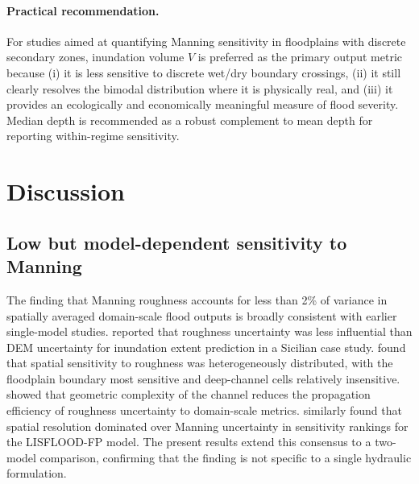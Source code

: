 \documentclass[review,12pt]{elsarticle}
\begin{document}
\paragraph{Practical recommendation.}
For studies aimed at quantifying Manning sensitivity in floodplains with
discrete secondary zones, inundation volume $V$ is preferred as the primary
output metric because (i) it is less sensitive to discrete wet/dry boundary
crossings, (ii) it still clearly resolves the bimodal distribution where it
is physically real, and (iii) it provides an ecologically and economically
meaningful measure of flood severity.
Median depth is recommended as a robust complement to mean depth for
reporting within-regime sensitivity.

\section{Discussion}
\label{sec:discussion}

\subsection{Low but model-dependent sensitivity to Manning}
\label{sec:disc_sensitivity}

The finding that Manning roughness accounts for less than 2\% of variance in
spatially averaged domain-scale flood outputs is broadly consistent with
earlier single-model studies.
\citet{aronica2002} reported that roughness uncertainty was less influential
than DEM uncertainty for inundation extent prediction in a Sicilian case
study.
\citet{hall2005} found that spatial sensitivity to roughness was
heterogeneously distributed, with the floodplain boundary most sensitive and
deep-channel cells relatively insensitive.
\citet{fewtrell2011} showed that geometric complexity of the channel reduces
the propagation efficiency of roughness uncertainty to domain-scale metrics.
\citet{savage2016} similarly found that spatial resolution dominated over
Manning uncertainty in sensitivity rankings for the LISFLOOD-FP model.
The present results extend this consensus to a two-model comparison,
confirming that the finding is not specific to a single hydraulic formulation.
\end{document}
